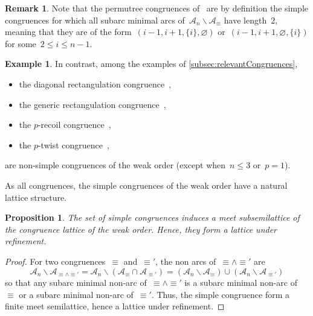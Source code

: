\documentclass{amsart}
\newtheorem{proposition}[theorem]{Proposition}
\theoremstyle{definition}
\newtheorem{example}[theorem]{Example}
\newtheorem{remark}[theorem]{Remark}
\newcommand{\ssm}{\smallsetminus} %
\newcommand{\arcs}{{\mathcal{A}}} %
\newcommand{\meet}{\wedge} %
\begin{document}
\begin{remark}
\label{rem:permutreeCongruences}
Note that the permutree congruences of~\cite{PilaudPons-permutrees} are by definition the simple congruences for which all subarc minimal arcs of~$\arcs_n \ssm \arcs_\equiv$ have length~$2$, meaning that they are of the form~$(i-1, i+1, \{i\}, \varnothing)$ or~$(i-1, i+1, \varnothing, \{i\})$ for some~$2 \le i \le n-1$.
\end{remark}

\begin{example}
In contrast, among the examples of \cref{subsec:relevantCongruences},
\begin{itemize}
\item the diagonal rectangulation congruence~\cite{LawReading,Giraudo,CardinalPilaud},
\item the generic rectangulation congruence~\cite{Reading-rectangulations,CardinalPilaud},
\item the $p$-recoil congruence~\cite{NovelliReutenauerThibon, Reading-HopfAlgebras, Pilaud-brickAlgebra},
\item the $p$-twist congruence~\cite{Pilaud-brickAlgebra},
\end{itemize}
are non-simple congruences of the weak order (except when~$n \le 3$ or~$p = 1$).
\end{example}

As all congruences, the simple congruences of the weak order have a natural lattice structure.

\begin{proposition}
\label{prop:simpleCongruenceMeetSemilattice}
The set of simple congruences induces a meet subsemilattice of the congruence lattice of the weak order.
Hence, they form a lattice under refinement.
\end{proposition}

\begin{proof}
For two congruences~$\equiv$ and~$\equiv'$, the non arcs of~${\equiv} \meet {\equiv'}$ are
\[
\arcs_n \ssm \arcs_{{\equiv} \meet {\equiv'}} = \arcs_n \ssm (\arcs_{\equiv} \cap \arcs_{\equiv'}) = (\arcs_n \ssm \arcs_{\equiv}) \cup (\arcs_n \ssm \arcs_{\equiv'})
\]
so that any subarc minimal non-arc of~${\equiv} \meet {\equiv'}$ is a subarc minimal non-arc of~${\equiv}$ or a subarc minimal non-arc of~${\equiv'}$.
Thus, the simple congruence form a finite meet semilattice, hence a lattice under refinement.
\end{proof}
\end{document}
